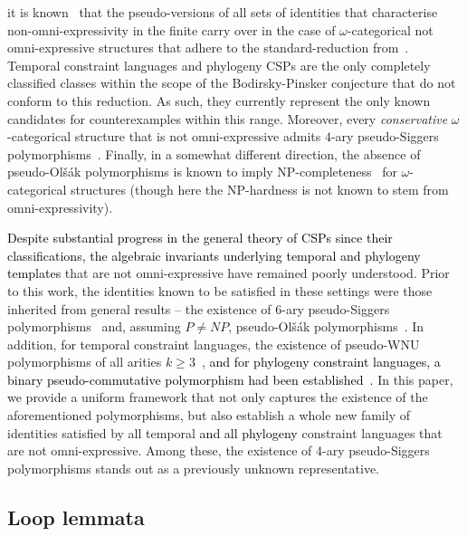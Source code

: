 \documentclass[a4paper,reqno, cleveref]{amsart}
\newcommand{\moritz}[1]{\todo{\textbf{Moritz:} #1}}
\newcommand\jo[1]{\textcolor{black}{#1}} %
\begin{document}
%
it is known~\cite[Proposition 6.6]{BPP-projective-homomorphisms} that the pseudo-versions of all  sets of identities that characterise non-omni-expressivity in the finite carry over in the case of $\omega$-categorical not omni-expressive structures that adhere  to the standard-reduction from~\cite{Bodirsky-Mottet}. 
%
Temporal constraint languages and phylogeny CSPs are the only completely classified classes within the scope of the Bodirsky-Pinsker conjecture that do not conform to this reduction. As such, they currently represent the only known candidates for counterexamples within this range.  
%
Moreover, every \emph{conservative} $\omega$-categorical structure that is not omni-expressive  admits $4$-ary pseudo-Siggers polymorphisms~\cite{sorrows}.  
%
Finally, in a somewhat different direction, the absence of pseudo-Ol\v{s}\'ak polymorphisms is known to imply NP-completeness~\cite{synergies} for $\omega$-categorical structures (though here the NP-hardness is not known to stem from omni-expressivity).


  \jo{Despite substantial progress in the general theory of CSPs since their classifications, the algebraic invariants underlying temporal and phylogeny templates} that are not omni-expressive  have remained poorly understood. Prior to this work,  the identities known to be satisfied in these settings were  those inherited from general results -- the existence of $6$-ary pseudo-Siggers polymorphisms~\cite{Topo} and, assuming $P\neq NP$, pseudo-Ol\v{s}\'ak polymorphisms~\cite{synergies}. In addition, for temporal constraint languages, the existence of pseudo-WNU polymorphisms of all arities  $k\geq 3$~\cite[Proposition 7.27]{RydvalDescr}, \jo{and for phylogeny constraint languages,  a binary pseudo-commutative polymorphism had been established~\cite{Phylo-Complexity}.} %
  In this paper, we provide a uniform framework that not only captures the existence of the aforementioned 
  polymorphisms, but also establish a whole new family of identities satisfied by all  temporal \jo{and all phylogeny} constraint languages that are not omni-expressive. Among these, the existence of 4-ary pseudo-Siggers polymorphisms stands out as a previously unknown representative. 



\subsection{Loop lemmata}
\end{document}

